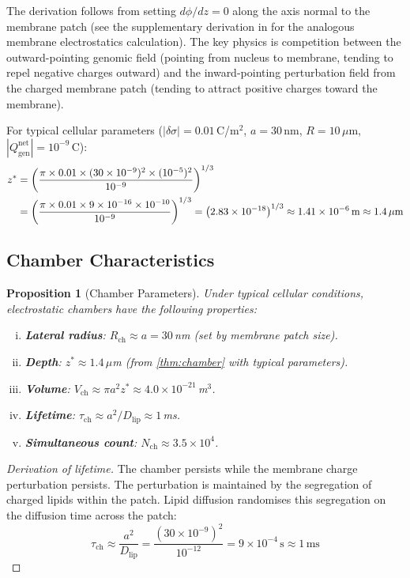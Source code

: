 \documentclass[12pt,a4paper]{article}
\newtheorem{proposition}[theorem]{Proposition}
\theoremstyle{definition}
\theoremstyle{remark}
\newcommand{\Qgen}{Q_{\mathrm{gen}}}
\newcommand{\abs}[1]{\left|#1\right|}
\newcommand{\Rcham}{R_{\mathrm{ch}}}
\newcommand{\Ncham}{N_{\mathrm{ch}}}
\newcommand{\taucham}{\tau_{\mathrm{ch}}}
\newcommand{\zstar}{z^{*}}
\begin{document}
The derivation follows from setting $d\phi/dz = 0$ along the axis normal to the membrane patch (see the supplementary derivation in \citet{McLaughlin2002} for the analogous membrane electrostatics calculation). The key physics is competition between the outward-pointing genomic field (pointing from nucleus to membrane, tending to repel negative charges outward) and the inward-pointing perturbation field from the charged membrane patch (tending to attract positive charges toward the membrane).

For typical cellular parameters ($\abs{\delta\sigma} = 0.01$\,C/m$^2$, $a = 30$\,nm, $R = 10\,\mu$m, $\abs{\Qgen^{\mathrm{net}}} = 10^{-9}$\,C):
\begin{align}
  \zstar &= \left(\frac{\pi \times 0.01 \times (30 \times 10^{-9})^2 \times (10^{-5})^2}{10^{-9}}\right)^{1/3} \notag \\
         &= \left(\frac{\pi \times 0.01 \times 9 \times 10^{-16} \times 10^{-10}}{10^{-9}}\right)^{1/3}
          = \left(2.83 \times 10^{-18}\right)^{1/3} \approx 1.41 \times 10^{-6}\,\mathrm{m} \approx 1.4\,\mu\mathrm{m}
\end{align}

\subsection{Chamber Characteristics}

\begin{proposition}[Chamber Parameters]
\label{prop:chamber_params}
Under typical cellular conditions, electrostatic chambers have the following properties:
\begin{enumerate}[(i)]
  \item \textbf{Lateral radius}: $\Rcham \approx a = 30$\,nm (set by membrane patch size).
  \item \textbf{Depth}: $\zstar \approx 1.4\,\mu$m (from \cref{thm:chamber} with typical parameters).
  \item \textbf{Volume}: $V_{\mathrm{ch}} \approx \pi a^2 \zstar \approx 4.0 \times 10^{-21}$\,m$^3$.
  \item \textbf{Lifetime}: $\taucham \approx a^2 / D_{\mathrm{lip}} \approx 1$\,ms.
  \item \textbf{Simultaneous count}: $\Ncham \approx 3.5 \times 10^4$.
\end{enumerate}
\end{proposition}

\begin{proof}[Derivation of lifetime]
The chamber persists while the membrane charge perturbation persists. The perturbation is maintained by the segregation of charged lipids within the patch. Lipid diffusion randomises this segregation on the diffusion time across the patch:
\begin{equation}
  \taucham \approx \frac{a^2}{D_{\mathrm{lip}}} = \frac{(30 \times 10^{-9})^2}{10^{-12}} = 9 \times 10^{-4}\,\mathrm{s} \approx 1\,\mathrm{ms}
\end{equation}
\end{proof}
\end{document}
